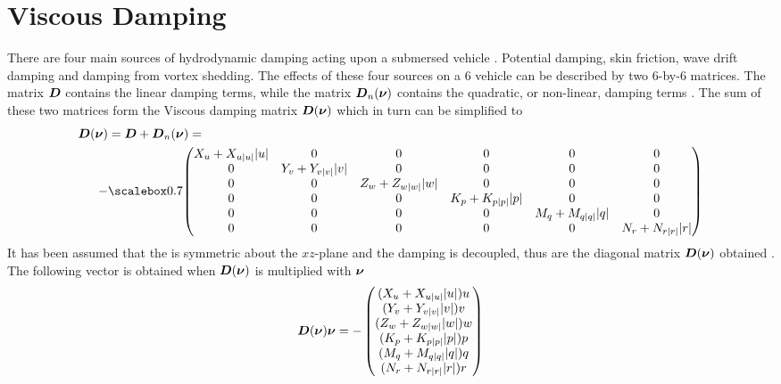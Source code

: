 \section{Viscous Damping}
There are four main sources of hydrodynamic damping acting upon a submersed vehicle \citep[p.122]{fossen2011}.
Potential damping, skin friction, wave drift damping and damping from vortex shedding. The effects of these four sources on a 6 \abbrDOF vehicle can be described by two 6-by-6 matrices.
The matrix $\boldsymbol{D}$ contains the linear damping terms, while the matrix $\boldsymbol{D}_{n}(\boldsymbol{\nu})$ contains the quadratic, or non-linear, damping terms \citep{fossen2011}. The sum of these two matrices form the Viscous damping matrix $\boldsymbol{D}(\boldsymbol{\nu})$ which in turn can be simplified to
\begin{equation}
\begin{split}
    \damping(\nuVector) &= \damping + \damping_{n}(\nuVector) = \\
    -& \scalemath{0.7}{\begin{pmatrix}
        \Xu+\Xuabsu\abs{u} & 0 & 0 & 0 & 0 & 0 \\
        0 & \Yv+\Yvabsv\abs{v} & 0 & 0 & 0 & 0 \\
        0 & 0 & \Zw+\Zwabsw\abs{w} & 0 & 0 & 0 \\
        0 & 0 & 0 & \Kp+\Kpabsp\abs{p} & 0 & 0 \\
        0 & 0 & 0 & 0 & \Mq+\Mqabsq\abs{q} & 0 \\
        0 & 0 & 0 & 0 & 0 & \Nr+\Nrabsr\abs{r} \\
    \end{pmatrix}}
\end{split}
\end{equation}
It has been assumed that the \abbrROV is symmetric about the $xz$-plane and the damping is decoupled, thus are the diagonal matrix $\boldsymbol{D}(\boldsymbol{\nu})$ obtained \citep[p.129-130]{fossen2011}. The following vector is obtained when $\boldsymbol{D}(\boldsymbol{\nu})$ is multiplied with $\boldsymbol{\nu}$
\begin{equation}
    \boldsymbol{D}(\boldsymbol{\nu}) \boldsymbol{\nu} =
     -\begin{pmatrix}
    (X_{u} + X_{u|u|} |u|) u\\
    (Y_{v} + Y_{v|v|} |v|) v\\
    (Z_{w} + Z_{w|w|} |w|) w\\
    (K_{p} + K_{p|p|} |p|) p\\
    (M_{q} + M_{q|q|} |q|) q\\
    (N_{r} + N_{r|r|} |r|) r\\
    \end{pmatrix}    
\end{equation}

